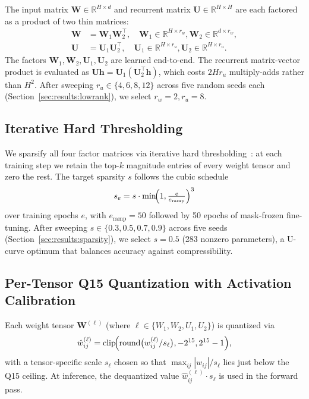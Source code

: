 The input matrix
$\mathbf{W} \in \mathbb{R}^{H \times d}$ and recurrent matrix
$\mathbf{U} \in \mathbb{R}^{H \times H}$ are each factored as a
product of two thin matrices:
\begin{align}
\mathbf{W} &= \mathbf{W}_1 \mathbf{W}_2^\top, \quad \mathbf{W}_1 \in \mathbb{R}^{H \times r_w}, \mathbf{W}_2 \in \mathbb{R}^{d \times r_w}, \\
\mathbf{U} &= \mathbf{U}_1 \mathbf{U}_2^\top, \quad \mathbf{U}_1 \in \mathbb{R}^{H \times r_u}, \mathbf{U}_2 \in \mathbb{R}^{H \times r_u}.
\end{align}
The factors $\mathbf{W}_1, \mathbf{W}_2, \mathbf{U}_1, \mathbf{U}_2$
are learned end-to-end. The recurrent matrix-vector product is
evaluated as $\mathbf{U}\mathbf{h} = \mathbf{U}_1(\mathbf{U}_2^\top \mathbf{h})$,
which costs $2 H r_u$ multiply-adds rather than $H^2$. After
sweeping $r_u \in \{4, 6, 8, 12\}$ across five random seeds each
(Section~\ref{sec:results:lowrank}), we select $r_w = 2, r_u = 8$.

\subsection{Iterative Hard Thresholding}
\label{sec:method:iht}

We sparsify all four factor matrices via iterative hard
thresholding~\cite{blumensath2009iht}: at each training step we
retain the top-$k$ magnitude entries of every weight tensor and
zero the rest. The target sparsity $s$ follows the cubic schedule
\begin{equation}
s_e = s \cdot \min\!\Bigl(1, \tfrac{e}{e_{\text{ramp}}}\Bigr)^{3}
\end{equation}
over training epochs $e$, with $e_{\text{ramp}} = 50$ followed by
50 epochs of mask-frozen fine-tuning. After sweeping
$s \in \{0.3, 0.5, 0.7, 0.9\}$ across five seeds
(Section~\ref{sec:results:sparsity}), we select $s = 0.5$
(283 nonzero parameters), a U-curve optimum that balances
accuracy against compressibility.

\subsection{Per-Tensor Q15 Quantization with Activation Calibration}
\label{sec:method:q15}

Each weight tensor $\mathbf{W}^{(\ell)}$ (where
$\ell \in \{W_1, W_2, U_1, U_2\}$) is quantized via
\begin{equation}
\hat{w}^{(\ell)}_{ij}
  = \mathrm{clip}\!\Bigl(
        \mathrm{round}\bigl(w^{(\ell)}_{ij} / s_\ell\bigr),
        -2^{15}, 2^{15}-1
    \Bigr),
\end{equation}
with a tensor-specific scale $s_\ell$ chosen so that
$\max_{ij}|w_{ij}| / s_\ell$ lies just below the Q15 ceiling.
At inference, the dequantized value $\hat{w}^{(\ell)}_{ij} \cdot s_\ell$
is used in the forward pass.

